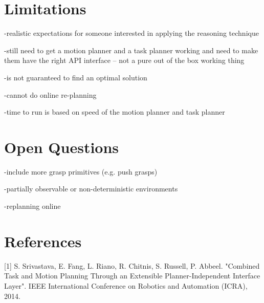 \documentclass[12pt]{article}
\begin{document}
\section{Limitations}

-realistic expectations for someone interested in applying the reasoning technique

-still need to get a motion planner and a task planner working and need to make them have the right API interface -- not a pure out of the box working thing

-is not guaranteed to find an optimal solution

-cannot do online re-planning

-time to run is based on speed of the motion planner and task planner

\section{Open Questions}

-include more grasp primitives (e.g. push grasps)

-partially observable or non-deterministic environments

-replanning online

\section{References}

[1] S. Srivastava, E. Fang, L. Riano, R. Chitnis, S. Russell, P. Abbeel. "Combined Task and Motion Planning Through an Extensible Planner-Independent Interface Layer". IEEE International Conference on Robotics and Automation (ICRA), 2014.
\end{document}
